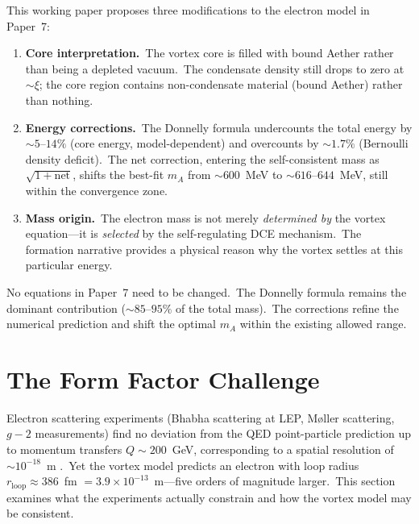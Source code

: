 \documentclass[12pt,letterpaper]{article}
\newcommand{\rloop}{r_{\mathrm{loop}}}
\begin{document}
This working paper proposes three modifications to the electron model in
Paper~7:

\begin{enumerate}[leftmargin=2em]
  \item \textbf{Core interpretation.}\ The vortex core is filled with bound
    Aether rather than being a depleted vacuum.\ The condensate density still
    drops to zero at $\sim\!\xi$; the core region contains non-condensate
    material (bound Aether) rather than nothing.

  \item \textbf{Energy corrections.}\ The Donnelly formula undercounts the
    total energy by $\sim\!5$--$14\%$ (core energy, model-dependent) and
    overcounts by $\sim\!1.7\%$ (Bernoulli density deficit).\ The net
    correction, entering the self-consistent mass as
    $\sqrt{1+\mathrm{net}}$, shifts the best-fit $m_A$ from
    $\sim\!600$~MeV to $\sim\!616$--$644$~MeV, still within the
    convergence zone.

  \item \textbf{Mass origin.}\ The electron mass is not merely
    \emph{determined by} the vortex equation---it is \emph{selected} by the
    self-regulating DCE mechanism.\ The formation narrative provides a
    physical reason why the vortex settles at this particular energy.

\end{enumerate}

No equations in Paper~7 need to be changed.\ The Donnelly formula remains
the dominant contribution ($\sim\!85$--$95\%$ of the total mass).\ The
corrections refine the numerical prediction and shift the optimal $m_A$
within the existing allowed range.


\section{The Form Factor Challenge}
\label{sec:form-factor}

Electron scattering experiments (Bhabha scattering at LEP, M\o ller
scattering, $g\!-\!2$ measurements) find no deviation from the QED
point-particle prediction up to momentum transfers
$Q \sim 200$~GeV, corresponding to a spatial resolution of
$\sim\!10^{-18}$~m \cite{LEP-Bhabha}.\ Yet the vortex model predicts an
electron with loop radius $\rloop \approx 386$~fm
$= 3.9 \times 10^{-13}$~m---five orders of magnitude larger.\ This section
examines what the experiments actually constrain and how the vortex model
may be consistent.
\end{document}
